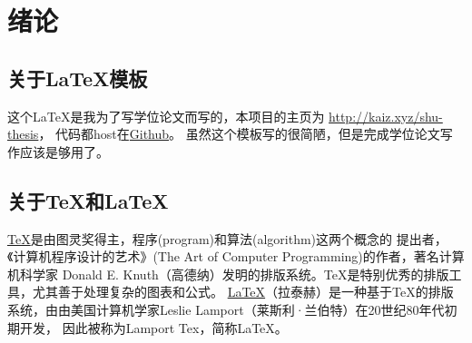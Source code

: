\documentclass[UTF8]{ctexart}
\numberwithin{equation}{section} %
\numberwithin{table}{section} %
\begin{document}
\linespread{1.6} \selectfont  %

 
\setcounter{page}{7}  %

{\hypersetup{linkcolor=black}
\tableofcontents}

\pagebreak
\section{绪论}
\setcounter{page}{1}
\subsection{关于\LaTeX  模板}
这个\LaTeX  是我为了写学位论文而写的，本项目的主页为 \url{http://kaiz.xyz/shu-thesis}，
代码都host在\href{https://github.com/zeakey/shu-thesis}{Github}。
%
虽然这个模板写的很简陋，但是完成学位论文写作应该是够用了。

\subsection{关于\TeX 和\LaTeX  }
\href{https://en.wikipedia.org/wiki/TeX}{\TeX }是由图灵奖得主，程序(program)和算法(algorithm)这两个概念的
提出者，《计算机程序设计的艺术》(The Art of Computer Programming)的作者，著名计算机科学家
Donald E. Knuth（高德纳）发明的排版系统。TeX是特别优秀的排版工具，尤其善于处理复杂的图表和公式。
%
\href{https://en.wikipedia.org/wiki/LaTeX }{\LaTeX }（拉泰赫）是一种基于\TeX 的排版系统，由由美国计算机学家Leslie Lamport（莱斯利·兰伯特）在20世纪80年代初期开发，
因此被称为Lamport Tex，简称LaTeX。
\end{document}
